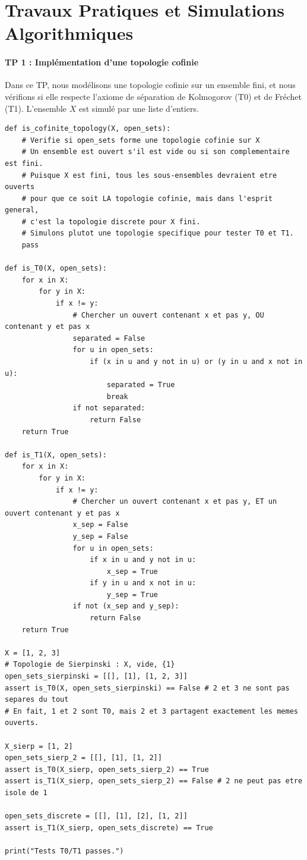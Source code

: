 \documentclass[11pt,a4paper]{article}
\begin{document}
\newpage
\part{Travaux Pratiques et Simulations Algorithmiques}


\subsection{TP 1 : Implémentation d'une topologie cofinie}


Dans ce TP, nous modélisons une topologie cofinie sur un ensemble fini, et nous vérifions si elle respecte l'axiome de séparation de Kolmogorov (T0) et de Fréchet (T1).
L'ensemble $X$ est simulé par une liste d'entiers.

\begin{lstlisting}
def is_cofinite_topology(X, open_sets):
    # Verifie si open_sets forme une topologie cofinie sur X
    # Un ensemble est ouvert s'il est vide ou si son complementaire est fini.
    # Puisque X est fini, tous les sous-ensembles devraient etre ouverts
    # pour que ce soit LA topologie cofinie, mais dans l'esprit general,
    # c'est la topologie discrete pour X fini.
    # Simulons plutot une topologie specifique pour tester T0 et T1.
    pass

def is_T0(X, open_sets):
    for x in X:
        for y in X:
            if x != y:
                # Chercher un ouvert contenant x et pas y, OU contenant y et pas x
                separated = False
                for u in open_sets:
                    if (x in u and y not in u) or (y in u and x not in u):
                        separated = True
                        break
                if not separated:
                    return False
    return True

def is_T1(X, open_sets):
    for x in X:
        for y in X:
            if x != y:
                # Chercher un ouvert contenant x et pas y, ET un ouvert contenant y et pas x
                x_sep = False
                y_sep = False
                for u in open_sets:
                    if x in u and y not in u:
                        x_sep = True
                    if y in u and x not in u:
                        y_sep = True
                if not (x_sep and y_sep):
                    return False
    return True

X = [1, 2, 3]
# Topologie de Sierpinski : X, vide, {1}
open_sets_sierpinski = [[], [1], [1, 2, 3]]
assert is_T0(X, open_sets_sierpinski) == False # 2 et 3 ne sont pas separes du tout
# En fait, 1 et 2 sont T0, mais 2 et 3 partagent exactement les memes ouverts.

X_sierp = [1, 2]
open_sets_sierp_2 = [[], [1], [1, 2]]
assert is_T0(X_sierp, open_sets_sierp_2) == True
assert is_T1(X_sierp, open_sets_sierp_2) == False # 2 ne peut pas etre isole de 1

open_sets_discrete = [[], [1], [2], [1, 2]]
assert is_T1(X_sierp, open_sets_discrete) == True

print("Tests T0/T1 passes.")
\end{lstlisting}
\end{document}
